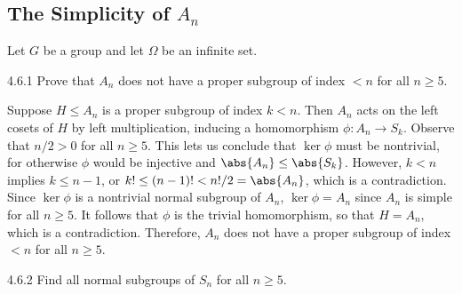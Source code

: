 \subsection{\texorpdfstring{The Simplicity of $A_n$}{The Simplicity of An}}

Let $G$ be a group and let $\Omega$ be an infinite set.

\begin{exercise}{4.6.1}
	Prove that $A_n$ does not have a proper subgroup of index $< n$ for all $n \geq 5$.
\end{exercise}

\begin{sol}
	Suppose $H \leq A_n$ is a proper subgroup of index $k < n$.
	Then $A_n$ acts on the left cosets of $H$ by left multiplication, inducing a homomorphism $\phi \colon A_n \to S_k$.
	Observe that $n/2 > 0$ for all $n \geq 5$.
	This lets us conclude that $\ker\phi$ must be nontrivial, for otherwise $\phi$ would be injective and $\abs{A_n} \leq \abs{S_k}$.
	However, $k < n$ implies $k \leq n - 1$, or $k! \leq (n - 1)! < n!/2 = \abs{A_n}$, which is a contradiction.
	Since $\ker\phi$ is a nontrivial normal subgroup of $A_n$, $\ker\phi = A_n$ since $A_n$ is simple for all $n \geq 5$.
	It follows that $\phi$ is the trivial homomorphism, so that $H = A_n$, which is a contradiction.
	Therefore, $A_n$ does not have a proper subgroup of index $< n$ for all $n \geq 5$.
\end{sol}

\begin{exercise}{4.6.2}
	Find all normal subgroups of $S_n$ for all $n \geq 5$.
\end{exercise}


